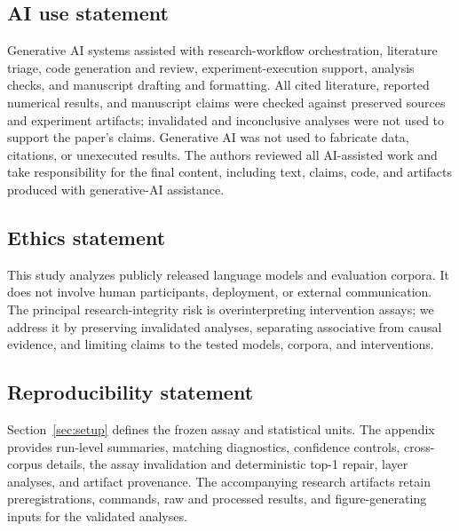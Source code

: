 \subsection*{AI use statement}

Generative AI systems assisted with research-workflow orchestration,
literature triage, code generation and review, experiment-execution support,
analysis checks, and manuscript drafting and formatting. All cited literature,
reported numerical results, and manuscript claims were checked against
preserved sources and experiment artifacts; invalidated and inconclusive
analyses were not used to support the paper's claims. Generative AI was not
used to fabricate data, citations, or unexecuted results. The authors reviewed
all AI-assisted work and take responsibility for the final content, including
text, claims, code, and artifacts produced with generative-AI assistance.

\subsection*{Ethics statement}

This study analyzes publicly released language models and evaluation corpora.
It does not involve human participants, deployment, or external communication.
The principal research-integrity risk is overinterpreting intervention assays;
we address it by preserving invalidated analyses, separating associative from
causal evidence, and limiting claims to the tested models, corpora, and
interventions.

\subsection*{Reproducibility statement}

Section~\ref{sec:setup} defines the frozen assay and statistical units. The
appendix provides run-level summaries, matching diagnostics, confidence
controls, cross-corpus details, the assay invalidation and deterministic
top-1 repair, layer analyses, and artifact provenance. The accompanying
research artifacts retain preregistrations, commands, raw and processed
results, and figure-generating inputs for the validated analyses.
